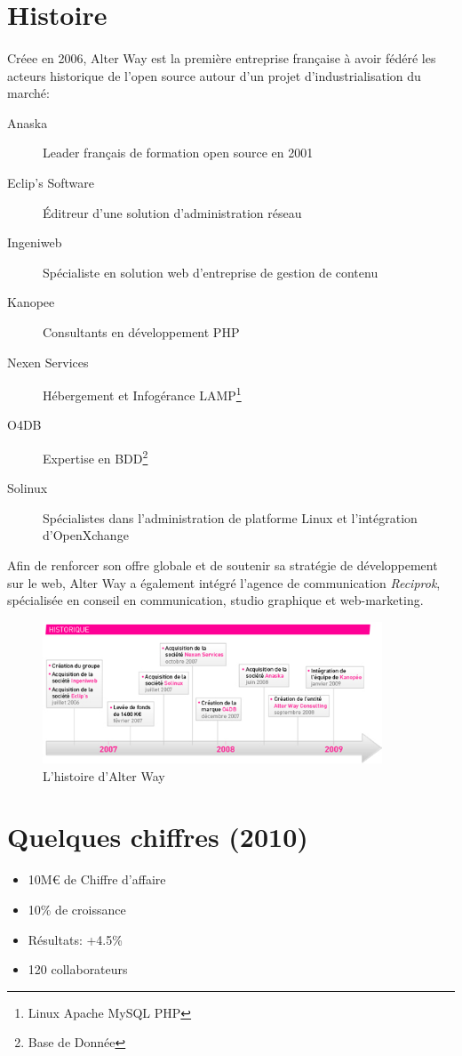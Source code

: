 \section{Histoire}
\paragraph*{}
	Créee en 2006, Alter Way est la première entreprise française à avoir fédéré les acteurs historique
	de l'open source autour d'un projet d'industrialisation du marché:

	\begin{description}
		\item[Anaska] Leader français de formation open source en 2001
		\item[Eclip's Software] Éditreur d'une solution d'administration réseau
		\item[Ingeniweb] Spécialiste en solution web d'entreprise de gestion de contenu
		\item[Kanopee] Consultants en développement PHP
		\item[Nexen Services] Hébergement et Infogérance LAMP\footnote{Linux Apache MySQL PHP}
		\item[O4DB] Expertise en BDD\footnote{Base de Donnée}
		\item[Solinux] Spécialistes dans l'administration de platforme Linux et l'intégration d'OpenXchange
	\end{description}

	Afin de renforcer son offre globale et de soutenir sa stratégie de développement sur le web, Alter Way
	a également intégré l'agence de communication \emph{Reciprok}, spécialisée en conseil en communication,
	studio graphique et web-marketing.

	\begin{figure}
		\centering
		\includegraphics[width=0.9\textwidth]{resource/img/historique_aw}
		\caption{L'histoire d'Alter Way}
	\end{figure}

\section{Quelques chiffres (2010)}
	\begin{itemize}
		\item 10M\euro{} de Chiffre d'affaire
		\item 10\% de croissance
		\item Résultats: +4.5\%
		\item 120 collaborateurs
	\end{itemize}

